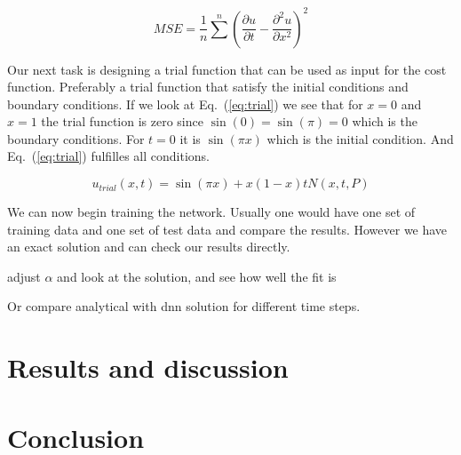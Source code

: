 \documentclass[a4paper, twocolumn]{article}
\newcommand{\eq} [1]{Eq.\ (\ref{eq:#1})}
\begin{document}
\begin{equation}
MSE = \frac{1}{n} \sum^n \left( \frac{\partial u}{\partial t} - \frac{\partial^2 u}{\partial x^2} \right)^2
\end{equation}

Our next task is designing a trial function that can be used as input for the cost function. Preferably a trial function that satisfy the initial conditions and boundary conditions. If we look at \eq{trial} we see that for $x = 0$ and $x = 1$ the trial function is zero since $\sin (0) = \sin (\pi) = 0$ which is the boundary conditions. For $t = 0$ it is $\sin(\pi x)$ which is the initial condition. And \eq{trial} fulfilles all conditions.

\begin{equation} \label{eq:trial}
u_{trial}(x,t) = \sin (\pi x) + x(1 - x)tN(x, t, P)
\end{equation}

We can now begin training the network. Usually one would have one set of training data and one set of test data and compare the results. However we have an exact solution and can check our results directly. 

adjust $\alpha$ and look at the solution, and see how well the fit is

Or compare analytical with dnn solution for different time steps.


\section{Results and discussion}
\lipsum[6]

\section{Conclusion}
\lipsum[7]


\onecolumn{
\printbibliography
}
\end{document}
